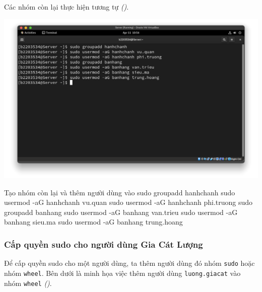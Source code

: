 Các nhóm còn lại thực hiện tương tự \textit{()}.

\begin{minipage}{.93\linewidth}
  \captionsetup{type=figure, skip=-15pt}
  \includegraphics[width=\linewidth]{./imgs/Hinh-15.png}
  \caption{\bfseries Tạo nhóm còn lại và thêm người dùng vào}
  \label{fig:groupadd-other}
\end{minipage}

\vspace{0.5cm}
\begin{bashlisting}{Tạo nhóm còn lại và thêm người dùng vào}
  sudo groupadd hanhchanh
  sudo usermod -aG hanhchanh vu.quan
  sudo usermod -aG hanhchanh phi.truong
  sudo groupadd banhang
  sudo usermod -aG banhang van.trieu
  sudo usermod -aG banhang sieu.ma
  sudo usermod -aG banhang trung.hoang
\end{bashlisting}


\subsubsection{Cấp quyền sudo cho người dùng Gia Cát Lượng}

Để cấp quyền sudo cho một người dùng, ta thêm người dùng đó nhóm \texttt{sudo} hoặc nhóm
\texttt{wheel}. Bên dưới là minh họa việc thêm người dùng \texttt{luong.giacat} vào nhóm
\texttt{wheel} \textit{()}.

